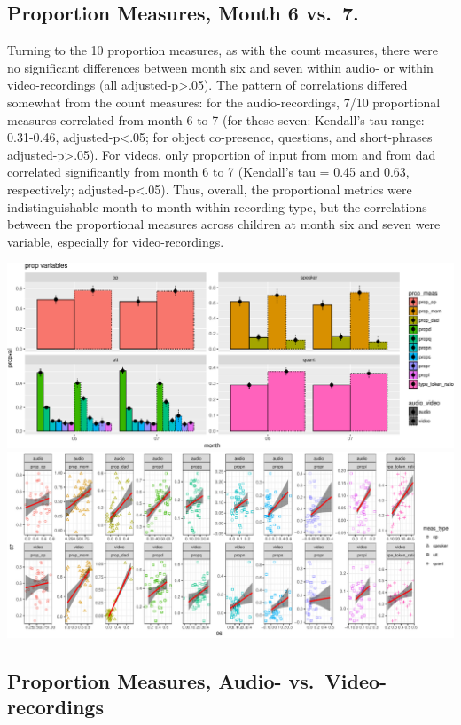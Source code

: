 \documentclass[man]{apa6}
\theoremstyle{definition}
\theoremstyle{definition}
\theoremstyle{definition}
\theoremstyle{remark}
\begin{document}
\subsection{Proportion Measures, Month 6
vs.~7.}\label{proportion-measures-month-6-vs.7.}

Turning to the 10 proportion measures, as with the count measures, there
were no significant differences between month six and seven within
audio- or within video-recordings (all adjusted-p\textgreater{}.05). The
pattern of correlations differed somewhat from the count measures: for
the audio-recordings, 7/10 proportional measures correlated from month 6
to 7 (for these seven: Kendall's tau range: 0.31-0.46,
adjusted-p\textless{}.05; for object co-presence, questions, and
short-phrases adjusted-p\textgreater{}.05). For videos, only proportion
of input from mom and from dad correlated significantly from month 6 to
7 (Kendall's tau = 0.45 and 0.63, respectively;
adjusted-p\textless{}.05). Thus, overall, the proportional metrics were
indistinguishable month-to-month within recording-type, but the
correlations between the proportional measures across children at month
six and seven were variable, especially for video-recordings.

\includegraphics{sixseven_papaja_files/figure-latex/gr_derived_props-1.pdf}
\includegraphics{sixseven_papaja_files/figure-latex/gr_derived_props-2.pdf}

\subsection{Proportion Measures, Audio-
vs.~Video-recordings}\label{proportion-measures-audio--vs.video-recordings}
\end{document}
